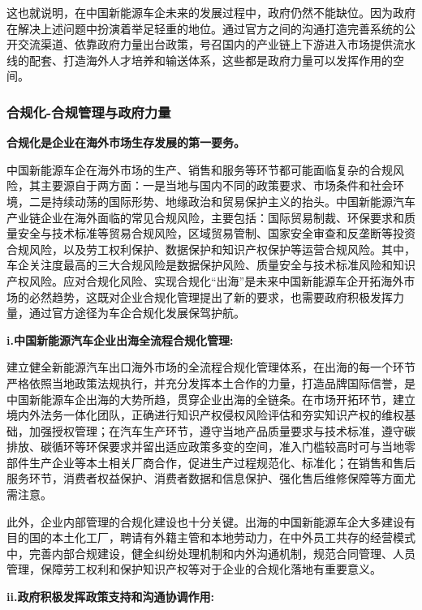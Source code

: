 \documentclass[a4paper, 10pt]{article}
\begin{document}
  这也就说明，在中国新能源车企未来的发展过程中，政府仍然不能缺位。因为政府在解决上述问题中扮演着举足轻重的地位。通过官方之间的沟通打造完善系统的公开交流渠道、依靠政府力量出台政策，号召国内的产业链上下游进入市场提供流水线的配套、打造海外人才培养和输送体系，这些都是政府力量可以发挥作用的空间。

  \subsubsection{合规化-合规管理与政府力量}
  
\textbf{合规化是企业在海外市场生存发展的第一要务。}

中国新能源车企在海外市场的生产、销售和服务等环节都可能面临复杂的合规风险，其主要源自于两方面：一是当地与国内不同的政策要求、市场条件和社会环境，二是持续动荡的国际形势、地缘政治和贸易保护主义的抬头。中国新能源汽车产业链企业在海外面临的常见合规风险，主要包括：国际贸易制裁、环保要求和质量安全与技术标准等贸易合规风险，区域贸易管制、国家安全审查和反垄断等投资合规风险，以及劳工权利保护、数据保护和知识产权保护等运营合规风险。其中，车企关注度最高的三大合规风险是数据保护风险、质量安全与技术标准风险和知识产权风险。应对合规化风险、实现合规化“出海”是未来中国新能源车企开拓海外市场的必然趋势，这既对企业合规化管理提出了新的要求，也需要政府积极发挥力量，通过官方途径为车企合规化发展保驾护航。

\vspace{10pt}
\noindent \textbf{i.中国新能源汽车企业出海全流程合规化管理:}

建立健全新能源汽车出口海外市场的全流程合规化管理体系，在出海的每一个环节严格依照当地政策法规执行，并充分发挥本土合作的力量，打造品牌国际信誉，是中国新能源车企出海的大势所趋，贯穿企业出海的全链条。在市场开拓环节，建立境内外法务一体化团队，正确进行知识产权侵权风险评估和夯实知识产权的维权基础，加强授权管理；在汽车生产环节，遵守当地产品质量要求与技术标准，遵守碳排放、碳循环等环保要求并留出适应政策多变的空间，准入门槛较高时可与当地零部件生产企业等本土相关厂商合作，促进生产过程规范化、标准化；在销售和售后服务环节，消费者权益保护、消费者数据和信息保护、强化售后维修保障等方面尤需注意。

此外，企业内部管理的合规化建设也十分关键。出海的中国新能源车企大多建设有目的国的本土化工厂，聘请有外籍主管和本地劳动力，在中外员工共存的经营模式中，完善内部合规建设，健全纠纷处理机制和内外沟通机制，规范合同管理、人员管理，保障劳工权利和保护知识产权等对于企业的合规化落地有重要意义。

\vspace{10pt}
\noindent \textbf{ii.政府积极发挥政策支持和沟通协调作用:}
\end{document}
